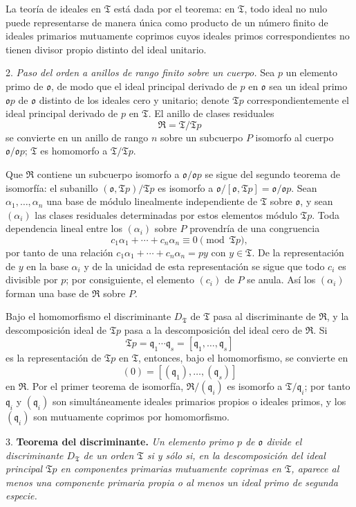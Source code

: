\documentclass[11pt]{article}
\providecommand{\mR}{\mathfrak{R}}
\providecommand{\mT}{\mathfrak{T}}
\providecommand{\mo}{\mathfrak{o}}
\providecommand{\mq}{\mathfrak{q}}
\begin{document}
La teoría de ideales en $\mT$ está dada por el teorema: en $\mT$, todo ideal no nulo puede representarse de manera única como producto de un número finito de ideales primarios mutuamente coprimos cuyos ideales primos correspondientes no tienen divisor propio distinto del ideal unitario.

2. \emph{Paso del orden a anillos de rango finito sobre un cuerpo.} Sea $p$ un elemento primo de $\mo$, de modo que el ideal principal derivado de $p$ en $\mo$ sea un ideal primo $\mo p$ de $\mo$ distinto de los ideales cero y unitario; denote $\mT p$ correspondientemente el ideal principal derivado de $p$ en $\mT$. El anillo de clases residuales
\[
        \mR=\mT/\mT p
\]
se convierte en un anillo de rango $n$ sobre un subcuerpo $P$ isomorfo al cuerpo $\mo/\mo p$; $\mT$ es homomorfo a $\mT/\mT p$.

Que $\mR$ contiene un subcuerpo isomorfo a $\mo/\mo p$ se sigue del segundo teorema de isomorfía: el subanillo $(\mo,\mT p)/\mT p$ es isomorfo a $\mo/[\mo,\mT p]=\mo/\mo p$. Sean $\alpha_1,\ldots,\alpha_n$ una base de módulo linealmente independiente de $\mT$ sobre $\mo$, y sean $(\alpha_i)$ las clases residuales determinadas por estos elementos módulo $\mT p$. Toda dependencia lineal entre los $(\alpha_i)$ sobre $P$ provendría de una congruencia
\[
        c_1\alpha_1+\cdots+c_n\alpha_n\equiv0\pmod{\mT p},
\]
por tanto de una relación $c_1\alpha_1+\cdots+c_n\alpha_n=py$ con $y\in\mT$. De la representación de $y$ en la base $\alpha_i$ y de la unicidad de esta representación se sigue que todo $c_i$ es divisible por $p$; por consiguiente, el elemento $(c_i)$ de $P$ se anula. Así los $(\alpha_i)$ forman una base de $\mR$ sobre $P$.

Bajo el homomorfismo el discriminante $D_\mT$ de $\mT$ pasa al discriminante de $\mR$, y la descomposición ideal de $\mT p$ pasa a la descomposición del ideal cero de $\mR$. Si
\[
        \mT p=\mq_1\cdots\mq_s=[\mq_1,\ldots,\mq_s]
\]
es la representación de $\mT p$ en $\mT$, entonces, bajo el homomorfismo, se convierte en
\[
        (0)=[(\mq_1),\ldots,(\mq_s)]
\]
en $\mR$. Por el primer teorema de isomorfía, $\mR/(\mq_i)$ es isomorfo a $\mT/\mq_i$; por tanto $\mq_i$ y $(\mq_i)$ son simultáneamente ideales primarios propios o ideales primos, y los $(\mq_i)$ son mutuamente coprimos por homomorfismo.

3. \textbf{Teorema del discriminante.} \emph{Un elemento primo $p$ de $\mo$ divide el discriminante $D_\mT$ de un orden $\mT$ si y sólo si, en la descomposición del ideal principal $\mT p$ en componentes primarias mutuamente coprimas en $\mT$, aparece al menos una componente primaria propia o al menos un ideal primo de segunda especie.}
\end{document}
